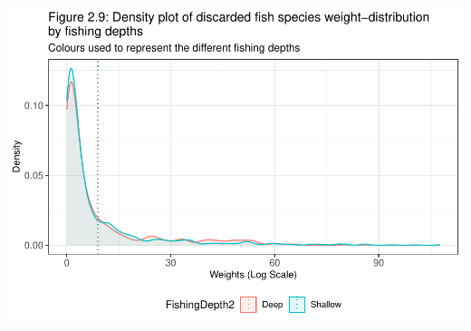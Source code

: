 \documentclass[
]{book}
\begin{document}
\begin{center}\includegraphics{bookdown-demo_files/figure-latex/unnamed-chunk-20-1} \end{center}
\end{document}
